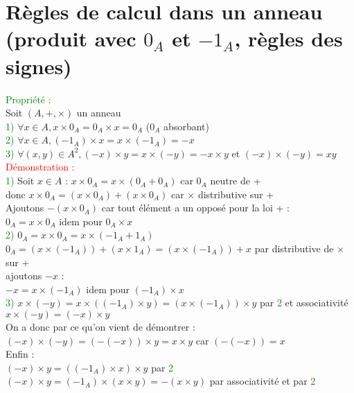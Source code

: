 \documentclass{article}
\begin{document}
\section{Règles de calcul dans un anneau (produit avec $0_A$ et $-1_A$, règles des signes)}
\textcolor{green}{Propriété :} \\ 
Soit $(A,+,\times)$ un anneau \\ 
\textcolor{green}{1)} $\forall x \in A, x \times 0_A=0_A \times x =0_A$ ($0_A$ absorbant) \\ 
\textcolor{green}{2)} $\forall x \in A , (-1_A)\times x = x \times (-1_A)=-x$ \\ 
\textcolor{green}{3)} $\forall (x,y) \in A^2,(-x) \times y = x\times (-y) = - x \times y$ et $(-x) \times (-y)=xy$ \\ 
\textcolor{red}{Démonstration :} \\ 
\textcolor{green}{1)} Soit $x \in A$ :
$x \times 0_A=x\times (0_A+0_A)$ car $0_A$ neutre de + \\ 
donc $ x \times 0_A=(x \times 0_A) + (x \times 0_A)$ car $\times$ distributive sur +  \\ 
Ajoutons $-(x \times 0_A)$ car tout élément a un opposé pour la loi + : \\ 
$0_A=x\times 0_A$ idem pour $0_A \times  x$ \\ 
\textcolor{green}{2)}  $0_A=x \times 0_A=x \times (-1_A + 1_A)$ \\ 
$0_A=(x \times (-1_A))+(x \times 1_A)=(x \times (-1_A))+x$ par distributive de $\times$ sur +\\
ajoutons $-x$ : \\ 
$-x=x\times (-1_A)$ idem pour $(-1_A) \times x$ \\ 
\textcolor{green}{3)} $x \times (-y)= x \times ((-1_A)\times y) = (x \times (-1_A)) \times y$ par \textcolor{green}{2} et associativité \\ 
$x \times (-y)= (-x) \times y$ \\ 
On a donc par ce qu'on vient de démontrer : \\ 
$(-x) \times (-y)=(-(-x)) \times y= x \times y$ car $(-(-x))=x$ \\
Enfin : \\ 
$(-x) \times y = ((-1_A) \times x) \times y$ par \textcolor{green}{2} \\ 
$(-x) \times y = (-1_A) \times (x \times y)=-(x \times y)$ par associativité et par \textcolor{green}{2} 
\end{document}
